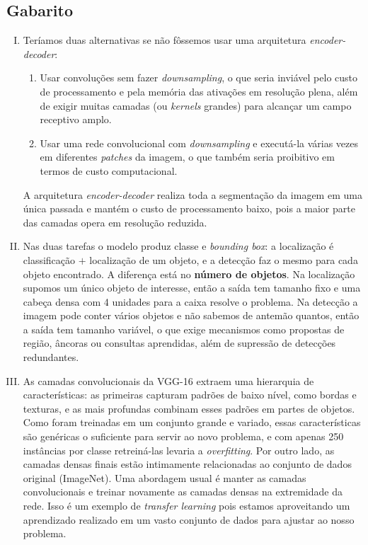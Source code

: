 \documentclass{dlproblemset}
\begin{document}
\newpage
\subsection*{Gabarito}
\color{blue}

\begin{enumerate}[I)]

\item Teríamos duas alternativas se não fôssemos usar uma arquitetura \textit{encoder-decoder}:
\begin{enumerate}[1.]
    \item Usar convoluções sem fazer \textit{downsampling}, o que seria inviável pelo custo de processamento e pela memória das ativações em resolução plena, além de exigir muitas camadas (ou \textit{kernels} grandes) para alcançar um campo receptivo amplo.
    \item Usar uma rede convolucional com \textit{downsampling} e executá-la várias vezes em diferentes \textit{patches} da imagem, o que também seria proibitivo em termos de custo computacional.
\end{enumerate}
A arquitetura \textit{encoder-decoder} realiza toda a segmentação da imagem em uma única passada e mantém o custo de processamento baixo, pois a maior parte das camadas opera em resolução reduzida.

\item Nas duas tarefas o modelo produz classe e \textit{bounding box}: a localização é classificação $+$ localização de um objeto, e a detecção faz o mesmo para cada objeto encontrado. A diferença está no \textbf{número de objetos}. Na localização supomos um único objeto de interesse, então a saída tem tamanho fixo e uma cabeça densa com 4 unidades para a caixa resolve o problema. Na detecção a imagem pode conter vários objetos e não sabemos de antemão quantos, então a saída tem tamanho variável, o que exige mecanismos como propostas de região, âncoras ou consultas aprendidas, além de supressão de detecções redundantes.

\item As camadas convolucionais da VGG-16 extraem uma hierarquia de características: as primeiras capturam padrões de baixo nível, como bordas e texturas, e as mais profundas combinam esses padrões em partes de objetos. Como foram treinadas em um conjunto grande e variado, essas características são genéricas o suficiente para servir ao novo problema, e com apenas 250 instâncias por classe retreiná-las levaria a \textit{overfitting}. Por outro lado, as camadas densas finais estão intimamente relacionadas ao conjunto de dados original (ImageNet). Uma abordagem usual é manter as camadas convolucionais e treinar novamente as camadas densas na extremidade da rede. Isso é um exemplo de \textit{transfer learning} pois estamos aproveitando um aprendizado realizado em um vasto conjunto de dados para ajustar ao nosso problema.


\end{enumerate}
\end{document}
